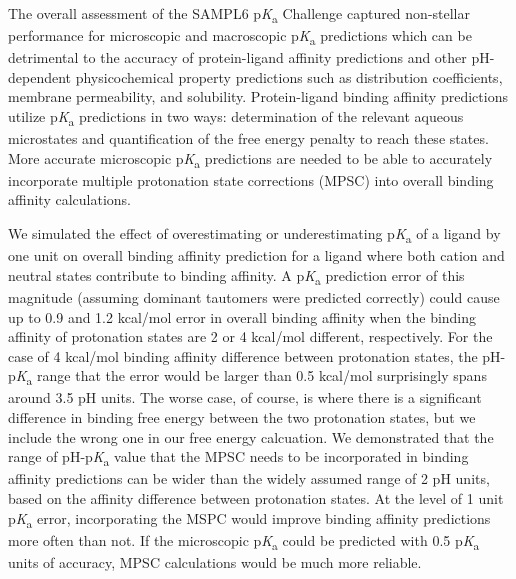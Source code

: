 \documentclass[9pt,lineno,final]{elife}
\newcommand{\pKa}{p\textit{K}\textsubscript{a}}
\begin{document}

The overall assessment of the SAMPL6 \pKa{} Challenge captured non-stellar performance for microscopic and macroscopic \pKa{} predictions which can be detrimental to the accuracy of protein-ligand affinity predictions and other pH-dependent physicochemical property predictions such as distribution coefficients, membrane permeability, and solubility.
Protein-ligand binding affinity predictions utilize \pKa{} predictions in two ways: determination of the relevant aqueous microstates and quantification of the free energy penalty to reach these states. 
More accurate microscopic \pKa{} predictions are needed to be able to accurately incorporate multiple protonation state corrections (MPSC) into overall binding affinity calculations. 

We simulated the effect of overestimating or underestimating \pKa{} of a ligand by one unit on overall binding affinity prediction for a ligand where both cation and neutral states contribute to binding affinity. 
A \pKa{} prediction error of this magnitude (assuming dominant tautomers were predicted correctly) could cause up to 0.9 and 1.2 kcal/mol error in overall binding affinity when the binding affinity of protonation states are 2 or 4 kcal/mol different, respectively. 
For the case of 4 kcal/mol binding affinity difference between protonation states, the pH-\pKa{} range that the error would be larger than 0.5 kcal/mol surprisingly spans around 3.5 pH units. 
The worse case, of course, is where there is a significant difference in binding free energy between the two protonation states, but we include the wrong one in our free energy calcuation.
We demonstrated that the range of pH-\pKa{} value that the MPSC needs to be incorporated in binding affinity predictions can be wider than the widely assumed range of 2 pH units, based on the affinity difference between protonation states. 
At the level of 1 unit \pKa{} error, incorporating the MSPC would improve binding affinity predictions more often than not. 
If the microscopic \pKa{} could be predicted with 0.5 \pKa{} units of accuracy, MPSC calculations would be much more reliable.
\end{document}
